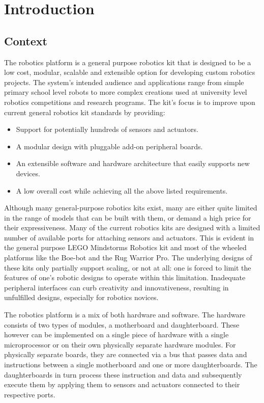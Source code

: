 \chapter{Introduction} 


\section{Context}
The \xten robotics platform is a general purpose robotics kit that is designed to be a low cost, modular, scalable and extensible option for developing custom robotics projects. The system's intended audience and applications range from simple primary school level robots to more complex creations used at university level robotics competitions and research programs. The \xten kit's focus is to improve upon current general robotics kit standards by providing:
\begin{itemize}
\item Support for potentially hundreds of sensors and actuators.
\item A modular design with pluggable add-on peripheral boards.
\item An extensible software and hardware architecture that easily supports new devices.
\item A low overall cost while achieving all the above listed requirements.
\end{itemize}

Although many general-purpose robotics kits exist, many are either quite limited in the range of models that can be built with them, or demand a high price for their expressiveness. Many of the current robotics kits are designed with a limited number of available ports for attaching sensors and actuators. This is evident in the general purpose LEGO Mindstorms Robotics kit and most of the wheeled platforms like the Boe-bot and the Rug Warrior Pro. %
The underlying designs of these kits only partially support scaling, or not at all: one is forced to limit the features of one's robotic designs to operate within this limitation. Inadequate peripheral interfaces can curb creativity and innovativeness, resulting in unfulfilled designs, especially for robotics novices.

The \xten robotics platform is a mix of both hardware and software. The hardware consists of two types of modules, a motherboard and daughterboard. These however can be implemented on a single piece of hardware with a single microprocessor or on their own physically separate hardware modules. For physically separate boards, they are connected via a bus that passes data and instructions between a single motherboard and one or more daughterboards. The daughterboards in turn process these instruction and data and subsequently execute them by applying them to sensors and actuators connected to their respective ports.

